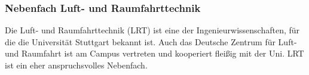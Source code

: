 \subsubsection{Nebenfach Luft- und Raumfahrttechnik}

Die Luft- und Raumfahrttechnik (LRT)
ist eine der Ingenieurwissenschaften,
für die die Universität Stuttgart bekannt ist.
Auch das Deutsche Zentrum für Luft- und Raumfahrt
ist am Campus vertreten und kooperiert fleißig mit der Uni.
LRT ist ein eher anspruchsvolles Nebenfach.





\begin{center}
\end{center}

